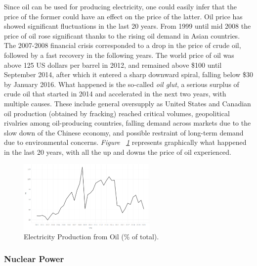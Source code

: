 \documentclass[a4paper,12pt]{book}
\begin{document}
Since oil can be used for producing electricity, one could easily infer that the price of the former could have an effect on the price of the latter. Oil price has showed significant fluctuations in the last 20 years. From 1999 until mid 2008 the price of oil rose significant thanks to the rising oil demand in Asian countries. The 2007-2008 financial crisis corresponded to a drop in the price of crude oil, followed by a fast recovery in the following years. The world price of oil was above 125 US dollars per barrel in 2012, and remained above \$100 until September 2014, after which it entered a sharp downward spiral, falling below \$30 by January 2016. What happened is the so-called \textit{oil glut}, a serious surplus of crude oil that started in 2014 and accelerated in the next two years, with multiple causes. These include general oversupply as United States and Canadian oil production (obtained by fracking) reached critical volumes, geopolitical rivalries among oil-producing countries, falling demand across markets due to the slow down of the Chinese economy, and possible restraint of long-term demand due to environmental concerns. \textit{Figure ~\ref{fig:oilbeh}} represents graphically what happened in the last 20 years, with all the up and downs the price of oil experienced.

\begin{figure}[tb]
\begin{center}
\captionsetup{justification=centering}
\includegraphics[width=0.6\textwidth]{Images/oilbeh.png}
\caption{Electricity Production from Oil (\% of total). }
\label{fig:oilbeh}
\end{center}
\end{figure}

\subsubsection*{Nuclear Power}
\end{document}
